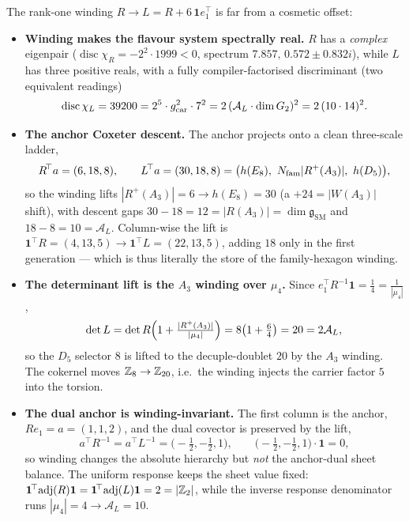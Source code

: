 \begin{winbox}
The rank-one winding $R\to L=R+6\,\mathbf 1 e_1^{\!\top}$ is far from a cosmetic offset:
\begin{itemize}\setlength\itemsep{2pt}
\item\textbf{Winding makes the flavour system spectrally real.} $R$ has a \emph{complex} eigenpair
($\operatorname{disc}\chi_R=-2^2\cdot1999<0$, spectrum $7.857,\,0.572\pm0.832i$), while $L$ has three
positive reals, with a fully compiler-factorised discriminant (two equivalent readings)
\[
  \operatorname{disc}\chi_L=39200=2^{5}\cdot g_{\mathrm{car}}^{2}\cdot7^{2}
  =2\,(\mathcal A_L\cdot\dim G_2)^2=2\,(10\cdot14)^2 .
\]
\item\textbf{The anchor Coxeter descent.} The anchor projects onto a clean three-scale ladder,
\[
  R^{\!\top}a=(6,18,8),\qquad L^{\!\top}a=(30,18,8)=\bigl(h(E_8),\ \Nfam|R^+(A_3)|,\ h(D_5)\bigr),
\]
so the winding lifts $|R^+(A_3)|=6\to h(E_8)=30$ (a $+24=|W(A_3)|$ shift), with descent gaps
$30-18=12=|R(A_3)|=\dim\mathfrak g_{\mathrm{SM}}$ and $18-8=10=\mathcal A_L$. Column-wise the lift is
$\mathbf1^{\!\top}R=(4,13,5)\to\mathbf1^{\!\top}L=(22,13,5)$, adding $18$ only in the first generation ---
which is thus literally the store of the family-hexagon winding.
\item\textbf{The determinant lift is the $A_3$ winding over $\mu_4$.} Since $e_1^{\!\top}R^{-1}\mathbf1=\tfrac14=\tfrac1{|\mu_4|}$,
\[
  \det L=\det R\Bigl(1+\tfrac{|R^+(A_3)|}{|\mu_4|}\Bigr)=8\bigl(1+\tfrac64\bigr)=20=2\mathcal A_L,
\]
so the $D_5$ selector $8$ is lifted to the decuple-doublet $20$ by the $A_3$ winding. The cokernel moves
$\mathbb{Z}_8\to\mathbb{Z}_{20}$, i.e.\ the winding injects the carrier factor $5$ into the torsion.
\item\textbf{The dual anchor is winding-invariant.} The first column is the anchor, $R e_1=a=(1,1,2)$, and
the dual covector is preserved by the lift,
\[
  a^{\!\top}R^{-1}=a^{\!\top}L^{-1}=\bigl(-\tfrac12,-\tfrac12,1\bigr),\qquad
  \bigl(-\tfrac12,-\tfrac12,1\bigr)\!\cdot\!\mathbf1=0 ,
\]
so winding changes the absolute hierarchy but \emph{not} the anchor-dual sheet balance. The uniform
response keeps the sheet value fixed: $\mathbf1^{\!\top}\!\operatorname{adj}(R)\mathbf1
=\mathbf1^{\!\top}\!\operatorname{adj}(L)\mathbf1=2=|\mathbb{Z}_2|$, while the inverse response denominator runs
$|\mu_4|=4\to\mathcal A_L=10$. \mE
\end{itemize}
\end{winbox}


